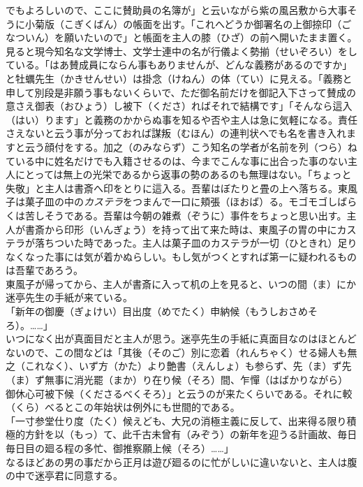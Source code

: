\documentclass{book}
\begin{document}
でもよろしいので、ここに賛助員の名簿が」と云いながら紫の風呂敷から大事そうに小菊版（こぎくばん）の帳面を出す。「これへどうか御署名の上御捺印（ごなついん）を願いたいので」と帳面を主人の膝（ひざ）の前へ開いたまま置く。見ると現今知名な文学博士、文学士連中の名が行儀よく勢揃（せいぞろい）をしている。「はあ賛成員にならん事もありませんが、どんな義務があるのですか」と牡蠣先生（かきせんせい）は掛念（けねん）の体（てい）に見える。「義務と申して別段是非願う事もないくらいで、ただ御名前だけを御記入下さって賛成の意さえ御表（おひょう）し被下（くださ）ればそれで結構です」「そんなら這入（はい）ります」と義務のかからぬ事を知るや否や主人は急に気軽になる。責任さえないと云う事が分っておれば謀叛（むほん）の連判状へでも名を書き入れますと云う顔付をする。加之（のみならず）こう知名の学者が名前を列（つら）ねている中に姓名だけでも入籍させるのは、今までこんな事に出合った事のない主人にとっては無上の光栄であるから返事の勢のあるのも無理はない。「ちょっと失敬」と主人は書斎へ印をとりに這入る。吾輩はぼたりと畳の上へ落ちる。東風子は菓子皿の中の\emph{カステラ}をつまんで一口に頬張（ほおば）る。モゴモゴしばらくは苦しそうである。吾輩は今朝の雑煮（ぞうに）事件をちょっと思い出す。主人が書斎から印形（いんぎょう）を持って出て来た時は、東風子の胃の中にカステラが落ちついた時であった。主人は菓子皿のカステラが一切（ひときれ）足りなくなった事には気が着かぬらしい。もし気がつくとすれば第一に疑われるものは吾輩であろう。\\
東風子が帰ってから、主人が書斎に入って机の上を見ると、いつの間（ま）にか迷亭先生の手紙が来ている。\\

「新年の御慶（ぎょけい）目出度（めでたく）申納候（もうしおさめそろ）。\ldots{}\ldots{}」\\

いつになく出が真面目だと主人が思う。迷亭先生の手紙に真面目なのはほとんどないので、この間などは「其後（そのご）別に恋着（れんちゃく）せる婦人も無之（これなく）、いず方（かた）より艶書（えんしょ）も参らず、先（ま）ず先（ま）ず無事に消光罷（まか）り在り候（そろ）間、乍憚（はばかりながら）御休心可被下候（くださるべくそろ）」と云うのが来たくらいである。それに較（くら）べるとこの年始状は例外にも世間的である。\\

「一寸参堂仕り度（たく）候えども、大兄の消極主義に反して、出来得る限り積極的方針を以（もっ）て、此千古未曾有（みぞう）の新年を迎うる計画故、毎日毎日目の廻る程の多忙、御推察願上候（そろ）\ldots{}\ldots{}」\\

なるほどあの男の事だから正月は遊び廻るのに忙がしいに違いないと、主人は腹の中で迷亭君に同意する。\\
\end{document}
